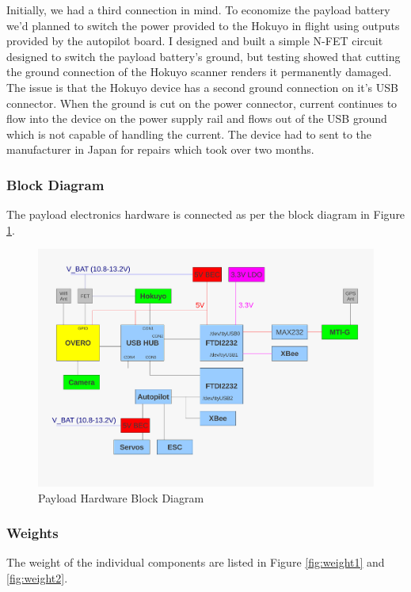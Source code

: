 \documentclass[a4paper,11pt]{report}
\begin{document}
Initially, we had a third connection in mind. To economize the payload battery we'd planned to switch the power provided to the Hokuyo in flight using outputs provided by the autopilot board. I designed and built a simple N-FET circuit designed to switch the payload battery's ground, but testing showed that cutting the ground connection of the Hokuyo scanner renders it permanently damaged. The issue is that the Hokuyo device has a second ground connection on it's USB connector. When the ground is cut on the power connector, current continues to flow into the device on the power supply rail and flows out of the USB ground which is not capable of handling the current. The device had to sent to the manufacturer in Japan for repairs which took over two months.

\subsubsection{Block Diagram}

The payload electronics hardware is connected as per the block diagram in Figure \ref{fig:hwdiagram}.

\begin{figure}[htb]
 \centering
 \includegraphics[width=12cm]{Payload_hardware_block_diagram}
 \caption{Payload Hardware Block Diagram}
 \label{fig:hwdiagram}
\end{figure}

\subsubsection{Weights}

The weight of the individual components are listed in Figure \ref{fig:weight1} and \ref{fig:weight2}.
\end{document}
